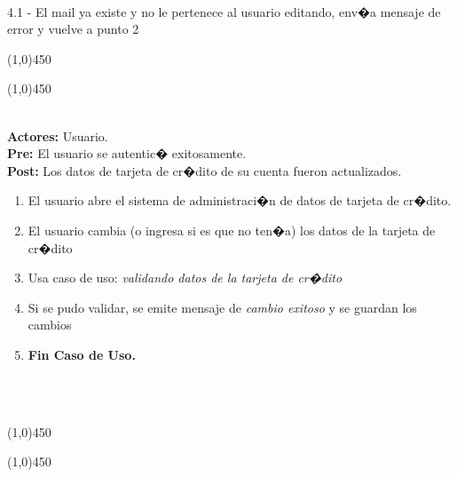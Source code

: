 \documentclass[11pt, a4paper, spanish]{article}
\begin{document}
\\
4.1 - El mail ya existe y no le pertenece al usuario editando, env�a mensaje de error y vuelve a punto 2

\begin{center} \line(1,0){450} \end{center}
\newpage
\begin{center} \line(1,0){450} \end{center}

 \\
\textbf{Actores:} Usuario. \\
\textbf{Pre:} El usuario se autentic� exitosamente. \\
\textbf{Post:} Los datos de tarjeta de cr�dito de su cuenta fueron actualizados.\\
\begin{enumerate}
	\item El usuario abre el sistema de administraci�n de datos de tarjeta de cr�dito.
	\item El usuario cambia (o ingresa si es que no ten�a) los datos de la tarjeta de cr�dito
	\item Usa caso de uso: \emph{validando datos de la tarjeta de cr�dito}
	\item Si se pudo validar,  se emite mensaje de \emph{cambio exitoso} y se guardan los cambios
	\item \textbf{Fin Caso de Uso.}
\end{enumerate}
 \\
\\
\begin{center} \line(1,0){450} \end{center}
\newpage
\begin{center} \line(1,0){450} \end{center}
\end{document}
